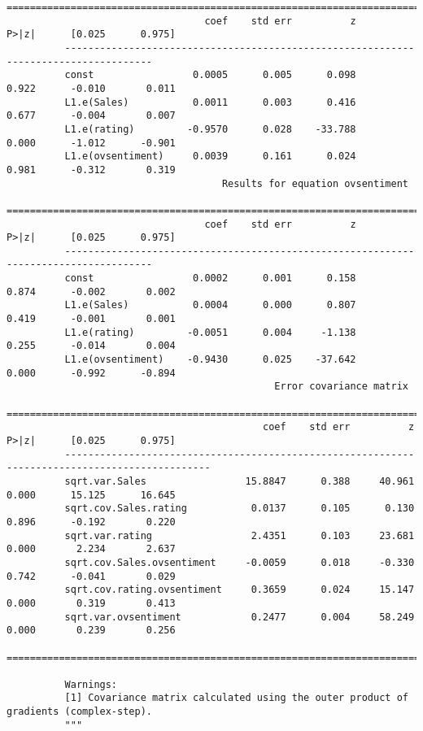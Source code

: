 \documentclass[11pt]{article}
\begin{document}
\begin{Verbatim}[commandchars=\\\{\}]
          =====================================================================================
                                  coef    std err          z      P>|z|      [0.025      0.975]
          -------------------------------------------------------------------------------------
          const                 0.0005      0.005      0.098      0.922      -0.010       0.011
          L1.e(Sales)           0.0011      0.003      0.416      0.677      -0.004       0.007
          L1.e(rating)         -0.9570      0.028    -33.788      0.000      -1.012      -0.901
          L1.e(ovsentiment)     0.0039      0.161      0.024      0.981      -0.312       0.319
                                     Results for equation ovsentiment                          
          =====================================================================================
                                  coef    std err          z      P>|z|      [0.025      0.975]
          -------------------------------------------------------------------------------------
          const                 0.0002      0.001      0.158      0.874      -0.002       0.002
          L1.e(Sales)           0.0004      0.000      0.807      0.419      -0.001       0.001
          L1.e(rating)         -0.0051      0.004     -1.138      0.255      -0.014       0.004
          L1.e(ovsentiment)    -0.9430      0.025    -37.642      0.000      -0.992      -0.894
                                              Error covariance matrix                                    
          ===============================================================================================
                                            coef    std err          z      P>|z|      [0.025      0.975]
          -----------------------------------------------------------------------------------------------
          sqrt.var.Sales                 15.8847      0.388     40.961      0.000      15.125      16.645
          sqrt.cov.Sales.rating           0.0137      0.105      0.130      0.896      -0.192       0.220
          sqrt.var.rating                 2.4351      0.103     23.681      0.000       2.234       2.637
          sqrt.cov.Sales.ovsentiment     -0.0059      0.018     -0.330      0.742      -0.041       0.029
          sqrt.cov.rating.ovsentiment     0.3659      0.024     15.147      0.000       0.319       0.413
          sqrt.var.ovsentiment            0.2477      0.004     58.249      0.000       0.239       0.256
          ===============================================================================================
          
          Warnings:
          [1] Covariance matrix calculated using the outer product of gradients (complex-step).
          """
\end{Verbatim}
            
\end{document}
